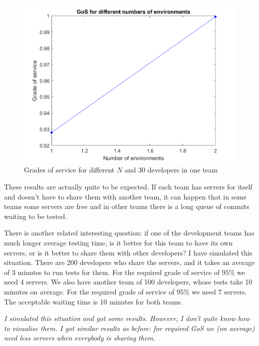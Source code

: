 \documentclass[a4paper]{article}
\begin{document}
\begin{figure}[h!]
\includegraphics[scale=0.7]{plots/Grade_of_service_30x10_developers.png}
\caption{Grades of service for different $N$ and 30 developers in one team}
\label{30_one_team}
\end{figure} 

\noindent These results are actually quite to be expected. If each team has servers for itself and doesn't have to share them with another team, it can happen that in some teams some servers are free and in other teams there is a long queue of commits waiting to be tested.

\noindent There is another related interesting question: if one of the development teams has much longer average testing time, is it better for this team to have its own servers, or is it better to share them with other developers?
I have simulated this situation. There are 200 developers who share the servers, and it takes an average of 3 minutes to run tests for them. For the required grade of service of $95\%$ we need 4 servers. 
\newline We also have another team of 100 developers, whose tests take 10 minutes on average. For the required grade of service of $95\%$ we need 7 servers. The acceptable waiting time is 10 minutes for both teams. 

\textit{I simulated this situation and got some results. However, I don't quite know how to visualise them. I got similar results as before: for required GoS we (on average) need less servers when everybody is sharing them. }
\end{document}
